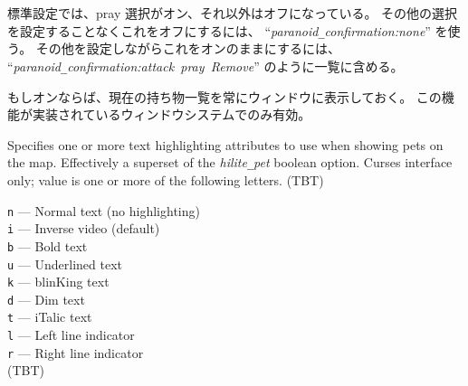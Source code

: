 標準設定では、pray 選択がオン、それ以外はオフになっている。
その他の選択を設定することなくこれをオフにするには、
``{\it paranoid\verb+_+confirmation:none}'' を使う。
その他を設定しながらこれをオンのままにするには、
``{\it par\-a\-noid\verb+_+con\-fir\-ma\-tion:attack~pray~Remove}'' のように一覧に含める。
\item[\ib{perm\verb+_+invent}]
もしオンならば、現在の持ち物一覧を常にウィンドウに表示しておく。
この機能が実装されているウィンドウシステムでのみ有効。
\item[\ib{petattr}]
Specifies one or more text highlighting attributes to use when showing
pets on the map.
Effectively a superset of the {\it hilite\verb+_+pet\/} boolean option.
Curses interface only; value is one or more of the following letters.
(TBT)

{\tt n} --- Normal text (no highlighting)\\
{\tt i} --- Inverse video (default)\\
{\tt b} --- Bold text\\
{\tt u} --- Underlined text\\
{\tt k} --- blinKing text\\
{\tt d} --- Dim text\\
{\tt t} --- iTalic text\\
{\tt l} --- Left line indicator\\
{\tt r} --- Right line indicator\\
(TBT)

